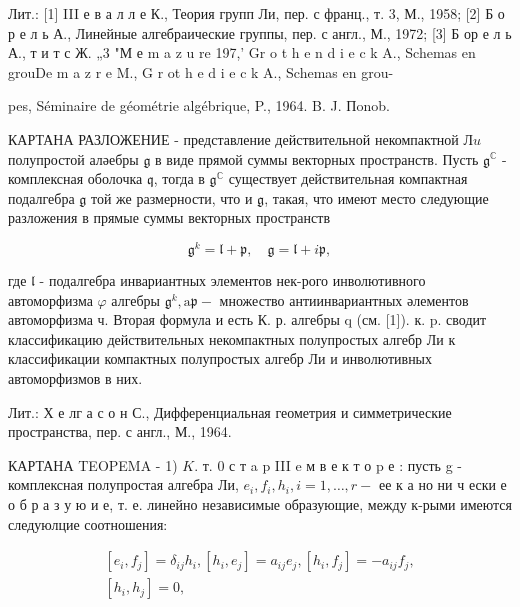 \documentclass[10pt]{article}
\begin{document}
Лит.: [1] III е в а л л е К., Теория групп Ли, пер. с франц., т. 3, М., 1958; [2] Б о р е л ь А., Линейные алгебраические группы, пер. с англ., М., 1972; [3] Б ор е л ь А., т и т с Ж. „3 "М е m a z u re 197,' Gr o t h e n d i e c k A., Schemas en grouDe m a z r e M., G r ot h e $\mathrm{d}$ i e c k A., Schemas en grou-

pes, Séminaire de géométrie algébrique, P., 1964. B. J. Пonob.



КАРТАНА РАЗЛОЖЕНИЕ - представление действительной некомпактной $Л u$ полупростой аләебры $\mathfrak{g}$ в виде прямой суммы векторных пространств. Пусть $\mathfrak{g}^{\mathbb{C}}$ - комплексная оболочка $\mathfrak{q}$, тогда в $\mathfrak{g}^{\mathbb{C}}$ существует действительная компактная подалгебра $\mathfrak{g}$ той же размерности, что и $\mathfrak{g}$, такая, что имеют место следующие разложения в прямые суммы векторных пространств



\[

\mathfrak{g}^{k}=\mathfrak{l}+\mathfrak{p}, \quad \mathfrak{g}=\mathfrak{l}+i \mathfrak{p},

\]



где $\mathfrak{l}$ - подалгебра инвариантных элементов нек-рого инволютивного автоморфизма $\varphi$ алгебры $\mathfrak{g}^{k}, \mathrm{a} \mathfrak{p}-$ множество антиинвариантных әлементов автоморфизма ч. Вторая формула и есть К. р. алгебры q (см. [1]). к. p. сводит классификацию действительных некомпактных полупростых алгебр Ли к классификации компактных полупростых алгебр Ли и инволютивных автоморфизмов в них.



Лит.: Х е лг а с о н С., Дифференциальная геометрия и симметрические пространства, пер. с англ., М., 1964.



КАРТАНА TEOPEMA - 1) $K$. т. 0 с т a p III $\mathrm{e}$ м в е к т о p е : пусть g - комплексная полупростая алгебра Ли, $e_{i}, f_{i}, h_{i}, i=1, \ldots, r-$ ее к а но ни ч ески е о б р а з у ю и е, т. е. линейно независимые образующие, между к-рыми имеются следуюлцие соотношения:



\[

\begin{gathered}

{\left[e_{i}, f_{j}\right]=\delta_{i j} h_{i},\left[h_{i}, e_{j}\right]=a_{i j} e_{j},\left[h_{i}, f_{j}\right]=-a_{i j} f_{j},} \\

{\left[h_{i}, h_{j}\right]=0,}

\end{gathered}

\]
\end{document}
